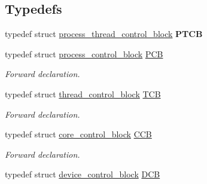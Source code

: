 \subsection*{Typedefs}
\begin{DoxyCompactItemize}
\item 
typedef struct \hyperlink{structprocess__thread__control__block}{process\+\_\+thread\+\_\+control\+\_\+block} {\bfseries P\+T\+CB}\hypertarget{group__rlists_ga2115e4c199a702aaf36f4571877bf013}{}\label{group__rlists_ga2115e4c199a702aaf36f4571877bf013}

\item 
typedef struct \hyperlink{structprocess__control__block}{process\+\_\+control\+\_\+block} \hyperlink{group__rlists_ga91aaadf0c3f9cef2293a99c69795323f}{P\+CB}\hypertarget{group__rlists_ga91aaadf0c3f9cef2293a99c69795323f}{}\label{group__rlists_ga91aaadf0c3f9cef2293a99c69795323f}

\begin{DoxyCompactList}\small\item\em Forward declaration. \end{DoxyCompactList}\item 
typedef struct \hyperlink{structthread__control__block}{thread\+\_\+control\+\_\+block} \hyperlink{group__rlists_ga8e5eca0c5ec064a81ae9246c7d4f32ef}{T\+CB}\hypertarget{group__rlists_ga8e5eca0c5ec064a81ae9246c7d4f32ef}{}\label{group__rlists_ga8e5eca0c5ec064a81ae9246c7d4f32ef}

\begin{DoxyCompactList}\small\item\em Forward declaration. \end{DoxyCompactList}\item 
typedef struct \hyperlink{structcore__control__block}{core\+\_\+control\+\_\+block} \hyperlink{group__rlists_gac3d551eb0caa1296280ea2278b4f1b11}{C\+CB}\hypertarget{group__rlists_gac3d551eb0caa1296280ea2278b4f1b11}{}\label{group__rlists_gac3d551eb0caa1296280ea2278b4f1b11}

\begin{DoxyCompactList}\small\item\em Forward declaration. \end{DoxyCompactList}\item 
typedef struct \hyperlink{structdevice__control__block}{device\+\_\+control\+\_\+block} \hyperlink{group__rlists_ga5b4de7b0c72db6219c5a6dda2466181f}{D\+CB}\hypertarget{group__rlists_ga5b4de7b0c72db6219c5a6dda2466181f}{}\label{group__rlists_ga5b4de7b0c72db6219c5a6dda2466181f}


\end{DoxyCompactItemize}
